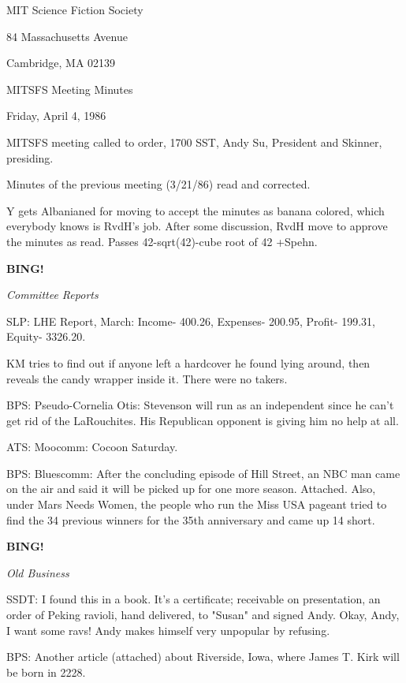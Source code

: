 \documentclass[12pt]{article}
\newcommand{\bing}{{\bf BING!} }
\newcommand{\goto}[1]{\bing \vskip 12pt \centerline{{\em{#1}}}}
\begin{document}
\begin{center}

MIT Science Fiction Society 

84 Massachusetts Avenue

Cambridge, MA 02139

\vspace{12pt}

MITSFS Meeting Minutes 

Friday, April 4, 1986

\end{center}
 
\vspace{18pt}

\setlength{\parskip}{6pt}

\noindent
MITSFS meeting called to order, 1700 SST,
Andy Su, President and Skinner, presiding.

Minutes of the previous meeting (3/21/86) read and corrected.

Y gets Albanianed for moving to accept the minutes as banana colored, which everybody knows is RvdH's job. After some discussion, RvdH move to approve the minutes as read. Passes 42-sqrt(42)-cube root of 42 +Spehn.

\goto{Committee Reports}

SLP: LHE Report, March: Income- 400.26, Expenses- 200.95, Profit- 199.31, Equity- 3326.20.

KM tries to find out if anyone left a hardcover he found lying around, then reveals the candy wrapper inside it. There were no takers.

BPS: Pseudo-Cornelia Otis: Stevenson will run as an independent since he can't get rid of the LaRouchites. His Republican opponent is giving him no help at all.

ATS: Moocomm: Cocoon Saturday.

BPS: Bluescomm: After the concluding episode of Hill Street, an NBC man came on the air and said it will be picked up for one more season. Attached. Also, under Mars Needs Women, the people who run the Miss USA pageant tried to find the 34 previous winners for the 35th anniversary and came up 14 short.

\goto{Old Business}

SSDT: I found this in a book. It's a certificate; receivable on presentation, an order of Peking ravioli, hand delivered, to "Susan" and signed Andy. Okay, Andy, I want some ravs! Andy makes himself very unpopular by refusing.

BPS: Another article (attached) about Riverside, Iowa, where James T. Kirk will be born in 2228.
\end{document}
